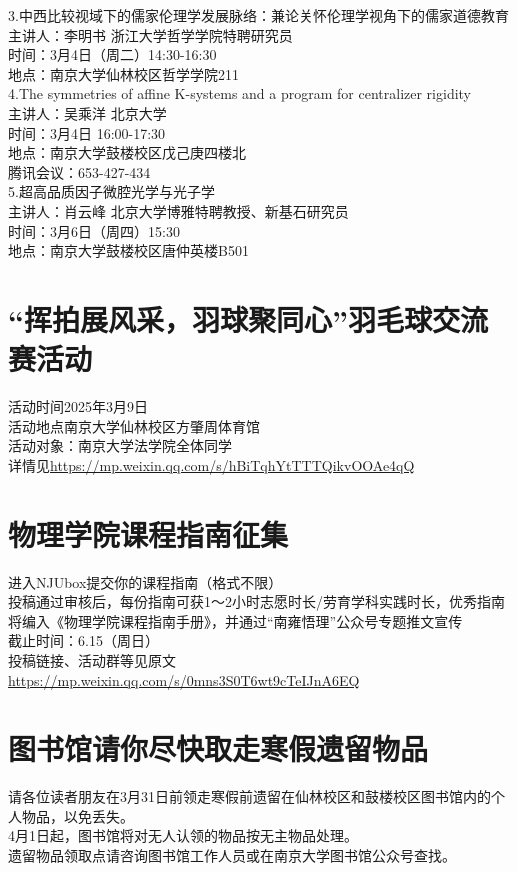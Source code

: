 \documentclass[letterpaper, 12pt]{article}
\begin{document}
\begin{multicols}{2}
3.中西比较视域下的儒家伦理学发展脉络：兼论关怀伦理学视角下的儒家道德教育\\
主讲人：李明书 浙江大学哲学学院特聘研究员\\
时间：3月4日（周二）14:30-16:30\\
地点：南京大学仙林校区哲学学院211\\

4.The symmetries of affine K-systems and a program for centralizer rigidity\\
主讲人：吴乘洋 北京大学\\
时间：3月4日 16:00-17:30\\
地点：南京大学鼓楼校区戊己庚四楼北\\
腾讯会议：653-427-434\\

5.超高品质因子微腔光学与光子学\\
主讲人：肖云峰 北京大学博雅特聘教授、新基石研究员\\
时间：3月6日（周四）15:30\\
地点：南京大学鼓楼校区唐仲英楼B501\\
\section{“挥拍展风采，羽球聚同心”羽毛球交流赛活动}
活动时间2025年3月9日 \\
活动地点南京大学仙林校区方肇周体育馆\\
活动对象：南京大学法学院全体同学\\
详情见\url{https://mp.weixin.qq.com/s/hBiTqhYtTTTQikvOOAe4qQ}\\

\section{物理学院课程指南征集}
进入NJUbox提交你的课程指南（格式不限）\\
投稿通过审核后，每份指南可获1～2小时志愿时长/劳育学科实践时长，优秀指南将编入《物理学院课程指南手册》，并通过“南雍悟理”公众号专题推文宣传\\
截止时间：6.15（周日）\\
投稿链接、活动群等见原文\url{https://mp.weixin.qq.com/s/0mns3S0T6wt9cTeIJnA6EQ}\\




\section{图书馆请你尽快取走寒假遗留物品}
请各位读者朋友在3月31日前领走寒假前遗留在仙林校区和鼓楼校区图书馆内的个人物品，以免丢失。\\
4月1日起，图书馆将对无人认领的物品按无主物品处理。\\
遗留物品领取点请咨询图书馆工作人员或在南京大学图书馆公众号查找。\\


\end{multicols}
\end{document}
